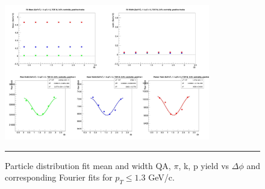 \begin{figure}[htbp!]
  \centering
    \includegraphics[width=0.8\textwidth]{lowptfits/fitParams_tof1_cent0_ch1_pT-11-13.jpg}
    \rule{35em}{0.5pt}
  \caption[Particle distribution fit mean and width QA. $\pi$, k, p yield vs $\Delta \phi$ and corresponding Fourier fits for $p_T\leq 1.3$ GeV/c.]{Particle distribution fit mean and width QA, $\pi$, k, p yield vs $\Delta \phi$ and corresponding Fourier fits for $p_T\leq 1.3$ GeV/c.}
  \label{fig:yieldphisinglegaus}
\end{figure}

